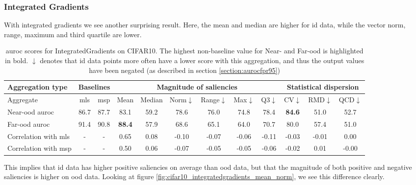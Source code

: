 \documentclass[UKenglish]{uiomasterthesis} %
\theoremstyle{definition}
\begin{document}
\subsubsection{Integrated Gradients}

With integrated gradients we see another surprising result. Here, the mean and median are higher for \ac{id} data, while the vector norm, range, maximum and third quartile are lower.

\begin{table}[H]
\setlength\tabcolsep{3pt}
\begin{center}
\begin{tabular}{ |p{5.1em}|c c|c c c c c c|c c c| }
    \hline
     \centering Aggregation type & \multicolumn{2}{c|}{Baselines} & \multicolumn{6}{c|}{Magnitude of saliencies} & \multicolumn{3}{p{8em}|}{\centering Statistical dispersion} \\
    \hline
    Aggregate & \ac{mls} & \ac{msp} & Mean & Median & Norm$\downarrow$ & Range$\downarrow$ & Max$\downarrow$ & Q3$\downarrow$ & CV$\downarrow$ & RMD$\downarrow$ & QCD$\downarrow$  \\
    \hline
    \rowcolor{near!50}
    Near-\ac{ood} \ac{auroc} & 86.7 & 87.7 & 83.1 & 59.2 & 78.6 & 76.0 & 74.8 & 78.4 &\textbf{ 84.6 }& 51.0 & 52.7  \\
    \hline
    \rowcolor{far!50}
    Far-\ac{ood} \ac{auroc} & 91.4 & 90.8 &\textbf{ 88.4 }& 57.9 & 68.6 & 65.1 & 64.0 & 70.7 & 80.0 & 57.4 & 51.0  \\
    \hline
    Correlation with \ac{mls}& - & - & 0.65 & 0.08 & -0.10 & -0.07 & -0.06 & -0.11 & -0.03 & -0.01 & 0.00  \\
    \hline
    Correlation with \ac{msp}& - & - & 0.50 & 0.06 & -0.07 & -0.05 & -0.05 & -0.06 & -0.02 & 0.01 & -0.00  \\
    \hline
    \end{tabular}
    \caption[\ac{auroc} scores for IntegratedGradients on CIFAR10]{\ac{auroc} scores for IntegratedGradients on CIFAR10. The highest non-baseline value for Near- and Far-\ac{ood} is highlighted in bold. $\downarrow$ denotes that \ac{id} data points more often have a lower score with this aggregation, and thus the output values have been negated (as described in section \ref{section:aurocfpr95})}
    \label{table:cifar10_integratedgradients_metrics}
\end{center}
\setlength\tabcolsep{6pt}
\end{table}

This implies that \ac{id} data has higher positive saliencies on average than \ac{ood} data, but that the magnitude of both positive and negative saliencies is higher on \ac{ood} data. Looking at figure \ref{fig:cifar10_integratedgradients_mean_norm}, we see this difference clearly.
\end{document}
